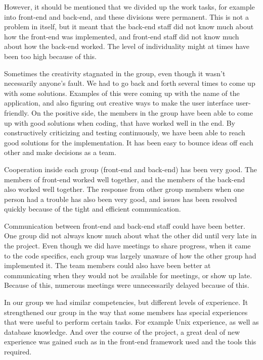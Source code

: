 However, it should be mentioned that we divided up the work tasks, for example into front-end and back-end, and these divisions were permanent. This is not a problem in itself, but it meant that the back-end staff did not know much about how the front-end was implemented, and front-end staff did not know much about how the back-end worked. The level of individuality might at times have been too high because of this.\newline

Sometimes the creativity stagnated in the group, even though it wasn't necessarily anyone's fault. We had to go back and forth several times to come up with some solutions. Examples of this were coming up with the name of the application, and also figuring out creative ways to make the user interface user-friendly. On the positive side, the members in the group have been able to come up with good solutions when coding, that have worked well in the end. By constructively criticizing and testing continuously, we have been able to reach good solutions for the implementation. It has been easy to bounce ideas off each other and make decisions as a team.\newline

Cooperation inside each group (front-end and back-end) has been very good. The members of front-end worked well together, and the members of the back-end also worked well together. The response from other group members when one person had a trouble has also been very good, and issues has been resolved quickly because of the tight and efficient communication.\newline

Communication between front-end and back-end staff could have been better. One group did not always know much about what the other did until very late in the project. Even though we did have meetings to share progress, when it came to the code specifics, each group was largely unaware of how the other group had implemented it. The team members could also have been better at communicating when they would not be available for meetings, or show up late. Because of this, numerous meetings were unnecessarily delayed because of this.\newline

In our group we had similar competencies, but different levels of experience. It strengthened our group in the way that some members has special experiences that were useful to perform certain tasks. For example Unix experience, as well as database knowledge. And over the course of the project, a great deal of new experience was gained such as in the front-end framework used and the tools this required.

